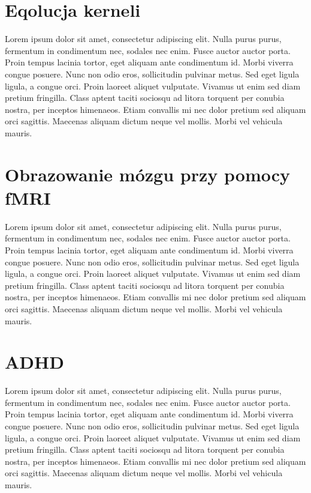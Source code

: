 \section{Eqolucja kerneli}
Lorem ipsum dolor sit amet, consectetur adipiscing elit. Nulla purus purus, fermentum in condimentum nec, sodales nec enim. Fusce auctor auctor porta. Proin tempus lacinia tortor, eget aliquam ante condimentum id. Morbi viverra congue posuere. Nunc non odio eros, sollicitudin pulvinar metus. Sed eget ligula ligula, a congue orci. Proin laoreet aliquet vulputate. Vivamus ut enim sed diam pretium fringilla. Class aptent taciti sociosqu ad litora torquent per conubia nostra, per inceptos himenaeos. Etiam convallis mi nec dolor pretium sed aliquam orci sagittis. Maecenas aliquam dictum neque vel mollis. Morbi vel vehicula mauris.

\section{Obrazowanie mózgu przy pomocy fMRI}
Lorem ipsum dolor sit amet, consectetur adipiscing elit. Nulla purus purus, fermentum in condimentum nec, sodales nec enim. Fusce auctor auctor porta. Proin tempus lacinia tortor, eget aliquam ante condimentum id. Morbi viverra congue posuere. Nunc non odio eros, sollicitudin pulvinar metus. Sed eget ligula ligula, a congue orci. Proin laoreet aliquet vulputate. Vivamus ut enim sed diam pretium fringilla. Class aptent taciti sociosqu ad litora torquent per conubia nostra, per inceptos himenaeos. Etiam convallis mi nec dolor pretium sed aliquam orci sagittis. Maecenas aliquam dictum neque vel mollis. Morbi vel vehicula mauris.

\section{ADHD}
Lorem ipsum dolor sit amet, consectetur adipiscing elit. Nulla purus purus, fermentum in condimentum nec, sodales nec enim. Fusce auctor auctor porta. Proin tempus lacinia tortor, eget aliquam ante condimentum id. Morbi viverra congue posuere. Nunc non odio eros, sollicitudin pulvinar metus. Sed eget ligula ligula, a congue orci. Proin laoreet aliquet vulputate. Vivamus ut enim sed diam pretium fringilla. Class aptent taciti sociosqu ad litora torquent per conubia nostra, per inceptos himenaeos. Etiam convallis mi nec dolor pretium sed aliquam orci sagittis. Maecenas aliquam dictum neque vel mollis. Morbi vel vehicula mauris.